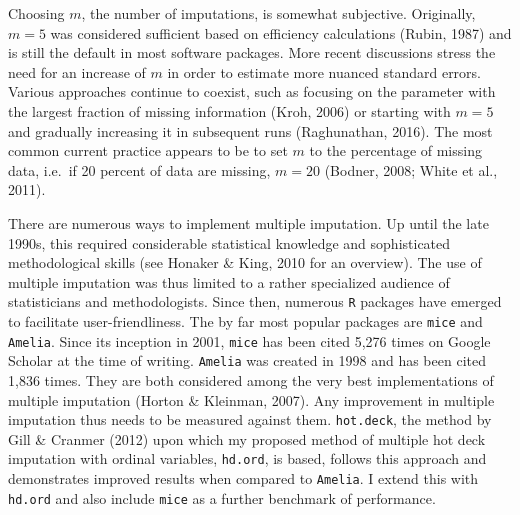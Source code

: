 \documentclass[12pt,econ]{sources/authesis}
\begin{document}
Choosing \(m\), the number of imputations, is somewhat subjective. Originally, \(m = 5\) was considered sufficient based on efficiency calculations (Rubin, 1987) and is still the default in most software packages. More recent discussions stress the need for an increase of \(m\) in order to estimate more nuanced standard errors. Various approaches continue to coexist, such as focusing on the parameter with the largest fraction of missing information (Kroh, 2006) or starting with \(m = 5\) and gradually increasing it in subsequent runs (Raghunathan, 2016). The most common current practice appears to be to set \(m\) to the percentage of missing data, i.e.~if 20 percent of data are missing, \(m = 20\) (Bodner, 2008; White et al., 2011).

There are numerous ways to implement multiple imputation. Up until the late 1990s, this required considerable statistical knowledge and sophisticated methodological skills (see Honaker \& King, 2010 for an overview). The use of multiple imputation was thus limited to a rather specialized audience of statisticians and methodologists. Since then, numerous \texttt{R} packages have emerged to facilitate user-friendliness. The by far most popular packages are \texttt{mice} and \texttt{Amelia}. Since its inception in 2001, \texttt{mice} has been cited 5,276 times on Google Scholar at the time of writing. \texttt{Amelia} was created in 1998 and has been cited 1,836 times. They are both considered among the very best implementations of multiple imputation (Horton \& Kleinman, 2007). Any improvement in multiple imputation thus needs to be measured against them. \texttt{hot.deck}, the method by Gill \& Cranmer (2012) upon which my proposed method of multiple hot deck imputation with ordinal variables, \texttt{hd.ord}, is based, follows this approach and demonstrates improved results when compared to \texttt{Amelia}. I extend this with \texttt{hd.ord} and also include \texttt{mice} as a further benchmark of performance.
\end{document}
